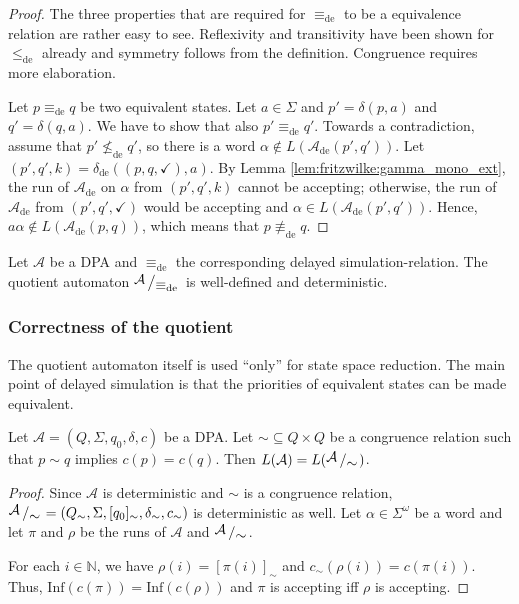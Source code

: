 \begin{proof}
	The three properties that are required for $\equiv_\text{de}$ to be a equivalence relation are rather easy to see. Reflexivity and transitivity have been shown for $\leq_\text{de}$ already and symmetry follows from the definition. Congruence requires more elaboration.

	Let $p \equiv_\text{de} q$ be two equivalent states. Let $a \in \Sigma$ and $p' = \delta(p, a)$ and $q' = \delta(q, a)$. We have to show that also $p' \equiv_\text{de} q'$. Towards a contradiction, assume that $p' \not\leq_\text{de} q'$, so there is a word $\alpha \notin L(\mathcal{A}_\text{de}(p', q'))$. Let $(p', q', k) = \delta_\text{de}((p, q, \checkmark), a)$. By Lemma \ref{lem:fritzwilke:gamma_mono_ext}, the run of $\mathcal{A}_\text{de}$ on $\alpha$ from $(p', q', k)$ cannot be accepting; otherwise, the run of $\mathcal{A}_\text{de}$ from $(p', q', \checkmark)$ would be accepting and $\alpha \in L(\mathcal{A}_\text{de}(p', q'))$. Hence, $a \alpha \notin L(\mathcal{A}_\text{de}(p, q))$, which means that $p \not\equiv_\text{de} q$.
\end{proof}

\begin{cor}
	Let $\mathcal{A}$ be a DPA and $\equiv_\text{de}$ the corresponding delayed simulation-relation. The quotient automaton $\bigslant{\mathcal{A}}{\equiv_\text{de}}$ is well-defined and deterministic.
\end{cor}


\vspace{1cm}
\subsubsection*{Correctness of the quotient}
The quotient automaton itself is used \enquote{only} for state space reduction. The main point of delayed simulation is that the priorities of equivalent states can be made equivalent. 

\begin{theorem}
	Let $\mathcal{A} = (Q, \Sigma, q_0, \delta, c)$ be a DPA. Let $\sim \subseteq Q \times Q$ be a congruence relation such that $p \sim q$ implies $c(p) = c(q)$. Then $L(\mathcal{A}) = L(\bigslant{\mathcal{A}}{\sim})$.
\end{theorem}

\begin{proof}
	Since $\mathcal{A}$ is deterministic and $\sim$ is a congruence relation, $\bigslant{\mathcal{A}}{\sim} = (Q_\sim, \Sigma, [q_0]_\sim, \delta_\sim, c_\sim)$ is deterministic as well. Let $\alpha \in \Sigma^\omega$ be a word and let $\pi$ and $\rho$ be the runs of $\mathcal{A}$ and $\bigslant{\mathcal{A}}{\sim}$. 
		
	For each $i \in \mathbb{N}$, we have $\rho(i) = [\pi(i)]_\sim$ and $c_\sim(\rho(i)) = c(\pi(i))$. Thus, $\text{Inf}(c(\pi)) = \text{Inf}(c(\rho))$ and $\pi$ is accepting iff $\rho$ is accepting.
\end{proof}

